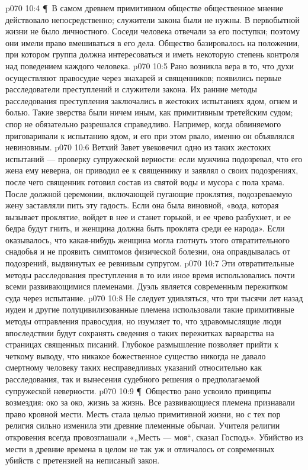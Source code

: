 \vs p070 10:4 \P\ В самом древнем примитивном обществе общественное мнение действовало непосредственно; служители закона были не нужны. В первобытной жизни не было личностного. Соседи человека отвечали за его поступки; поэтому они имели право вмешиваться в его дела. Общество базировалось на положении, при котором группа должна интересоваться и иметь некоторую степень контроля над поведением каждого человека.
\vs p070 10:5 Рано возникла вера в то, что духи осуществляют правосудие через знахарей и священников; появились первые расследователи преступлений и служители закона. Их ранние методы расследования преступления заключались в жестоких испытаниях ядом, огнем и болью. Такие зверства были ничем иным, как примитивным третейским судом; спор не обязательно разрешался справедливо. Например, когда обвиняемого приговаривали к испытанию ядом, и его при этом рвало, именно он объявлялся невиновным.
\vs p070 10:6 Ветхий Завет увековечил одно из таких жестоких испытаний --- проверку супружеской верности: если мужчина подозревал, что его жена ему неверна, он приводил ее к священнику и заявлял о своих подозрениях, после чего священник готовил состав из святой воды и мусора с пола храма. После должной церемонии, включающей пугающие проклятия, подозреваемую жену заставляли пить эту гадость. Если она была виновной, «вода, которая вызывает проклятие, войдет в нее и станет горькой, и ее чрево разбухнет, и ее бедра будут гнить, и женщина должна быть проклята среди ее народа». Если оказывалось, что какая\hyp{}нибудь женщина могла глотнуть этого отвратительного снадобья и не проявить симптомов физической болезни, она оправдывалась от подозрений, выдвинутых ее ревнивым супругом.
\vs p070 10:7 Эти отвратительные методы расследования преступления в то или иное время использовались почти всеми развивающимися племенами. Дуэль является современным пережитком суда через испытание.
\vs p070 10:8 Не следует удивляться, что три тысячи лет назад иудеи и другие полуцивилизованные племена использовали такие примитивные методы отправления правосудия, но изумляет то, что здравомыслящие люди впоследствии будут сохранять сведения о таких пережитках варварства на страницах священных писаний. Глубокое размышление позволяет прийти к четкому выводу, что никакое божественное существо никогда не давало смертному человеку таких несправедливых указаний относительно как расследования, так и вынесения судебного решения о предполагаемой супружеской неверности.
\vs p070 10:9 \P\ Общество рано усвоило принципы возмездия: око за око, жизнь за жизнь. Все развивающиеся племена признавали право кровной мести. Месть стала целью примитивной жизни, но с тех пор религия сильно изменила эти древние племенные обычаи. Учителя религии откровения всегда провозглашали «„Месть --- моя“, сказал Господь». Убийство из мести в древние времена в целом не так уж и отличалось от современных убийств с претензией на неписаный закон.
